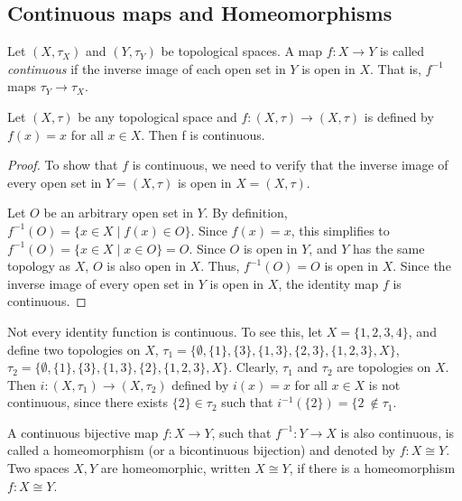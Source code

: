 \documentclass[12pt]{article} %
\begin{document}
\subsection{Continuous maps and Homeomorphisms}
\begin{definition}\parencite{BellezaCM2025}
Let \( (X, \tau_X) \) and \( (Y, \tau_Y) \) be topological spaces. A map \( f : X \to Y \) is called \emph{continuous} if the inverse image of each open set in \( Y \) is open in \( X \).  
That is, \( f^{-1}\) maps $\tau_Y \to \tau_X$.   
\end{definition}

\begin{example}
 Let $(X,\tau)$ be any topological space and $f : (X,\tau) \to (X,\tau)$ is defined
 by $f(x) = x$ for all $x\in X$. Then f is continuous.
\end{example}
\begin{proof}
To show that \( f \) is continuous, we need to verify that the inverse image of every open set in  
\( Y = (X, \tau) \) is open in \( X = (X, \tau) \).

Let \( O \) be an arbitrary open set in \( Y \). By definition, $f^{-1}(O) = \{ x \in X \mid f(x) \in O \}$.
Since \( f(x) = x \), this simplifies to $f^{-1}(O) = \{ x \in X \mid x \in O \} = O$. Since \( O \) is open in \( Y \), and \( Y \) has the same topology as \( X \), \( O \) is also open in \( X \). Thus, \( f^{-1}(O) = O \) is open in \( X \). Since the inverse image of every open set in \( Y \) is open in \( X \), the identity map \( f \) is continuous.
\end{proof}

\begin{remark}
Not every identity function is continuous. To see this, let \( X = \{1, 2, 3, 4\} \), and define two topologies on \( X \), $\tau_1 = \{\emptyset, \{1\}, \{3\}, \{1,3\}, \{2,3\}, \{1,2,3\}, X\}$, \\ $\tau_2 = \{\emptyset, \{1\}, \{3\}, \{1,3\}, \{2\}, \{1,2,3\}, X\}$. Clearly, \( \tau_1 \) and \( \tau_2 \) are topologies on \( X \). Then \( i : (X, \tau_1) \to (X, \tau_2) \) defined by $i(x) = x$ for all $x \in X$ is not continuous, since there exists \( \{2\} \in \tau_2 \) such that $i^{-1}(\{2\}) = \{2\ \notin \tau_1$.
\end{remark}

\begin{definition}[Homeomorphism]\parencite{Dugundji1966}
    A continuous bijective map $f: X \to Y$, such that $f^{-1}: Y \to X$ is also continuous, is called a homeomorphism (or a bicontinuous bijection) and denoted by $f: X \cong Y$. Two spaces $X, Y$ are homeomorphic, written $X \cong Y$, if there is a homeomorphism $f: X \cong Y$.
\end{definition}
\end{document}
